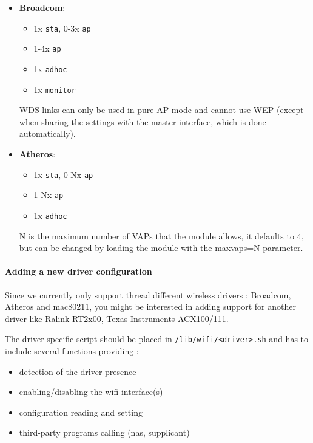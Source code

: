 \begin{itemize}
    \item \textbf{Broadcom}: \\
        \begin{itemize}
            \item 1x \texttt{sta}, 0-3x \texttt{ap}
            \item 1-4x \texttt{ap}
            \item 1x \texttt{adhoc}
            \item 1x \texttt{monitor}
        \end{itemize}

        WDS links can only be used in pure AP mode and cannot use WEP (except when sharing the
        settings with the master interface, which is done automatically).

    \item \textbf{Atheros}: \\
        \begin{itemize}
            \item 1x \texttt{sta}, 0-Nx \texttt{ap}
            \item 1-Nx \texttt{ap}
            \item 1x \texttt{adhoc}
        \end{itemize}

	N is the maximum number of VAPs that the module allows, it defaults to 4, but can be
	changed by loading the module with the maxvaps=N parameter.
\end{itemize}

\paragraph{Adding a new driver configuration}

Since we currently only support thread different wireless drivers : Broadcom, Atheros and mac80211,
you might be interested in adding support for another driver like Ralink RT2x00, 
Texas Instruments ACX100/111.

The driver specific script should be placed in \texttt{/lib/wifi/<driver>.sh} and has to
include several functions providing :

\begin{itemize}
	\item detection of the driver presence
	\item enabling/disabling the wifi interface(s)
	\item configuration reading and setting
	\item third-party programs calling (nas, supplicant)
\end{itemize}

